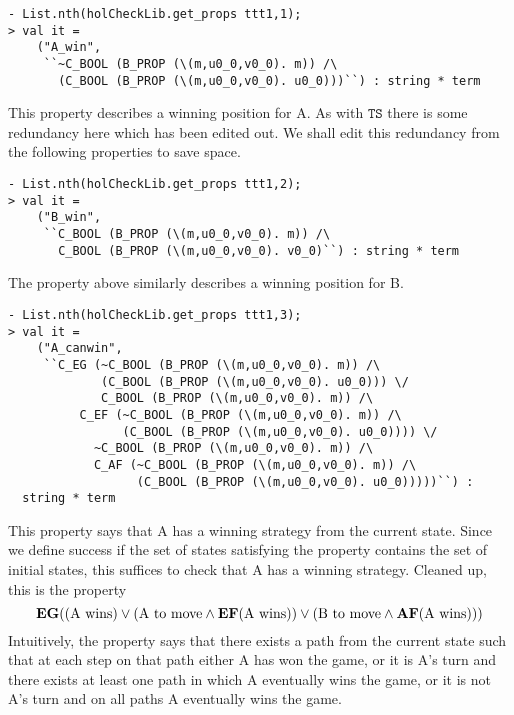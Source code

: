 \begin{session}
\begin{verbatim}
- List.nth(holCheckLib.get_props ttt1,1);
> val it =
    ("A_win",
     ``~C_BOOL (B_PROP (\(m,u0_0,v0_0). m)) /\
       (C_BOOL (B_PROP (\(m,u0_0,v0_0). u0_0)))``) : string * term
\end{verbatim}
\end{session}

This property describes a winning position for A. As with \(\mathtt{TS}\) there is some redundancy here which has been edited out. We shall edit this redundancy from the following properties to save space.

\begin{session}
\begin{verbatim}
- List.nth(holCheckLib.get_props ttt1,2);
> val it =
    ("B_win",
     ``C_BOOL (B_PROP (\(m,u0_0,v0_0). m)) /\
       C_BOOL (B_PROP (\(m,u0_0,v0_0). v0_0)``) : string * term
\end{verbatim}
\end{session}

The property above similarly describes a winning position for B.

\begin{session}\begin{verbatim}
- List.nth(holCheckLib.get_props ttt1,3);
> val it =
    ("A_canwin",
     ``C_EG (~C_BOOL (B_PROP (\(m,u0_0,v0_0). m)) /\
             (C_BOOL (B_PROP (\(m,u0_0,v0_0). u0_0))) \/
             C_BOOL (B_PROP (\(m,u0_0,v0_0). m)) /\
          C_EF (~C_BOOL (B_PROP (\(m,u0_0,v0_0). m)) /\
                (C_BOOL (B_PROP (\(m,u0_0,v0_0). u0_0)))) \/
            ~C_BOOL (B_PROP (\(m,u0_0,v0_0). m)) /\
            C_AF (~C_BOOL (B_PROP (\(m,u0_0,v0_0). m)) /\
                  (C_BOOL (B_PROP (\(m,u0_0,v0_0). u0_0)))))``) :
  string * term
\end{verbatim}\end{session}

This property says that A has a winning strategy from the current state. Since we define success if the set of states satisfying the property contains the set of initial states, this suffices to check that A has a winning strategy. Cleaned up, this is the \ctl property \[ \mathbf{EG} (\textup{(A wins)} \lor (\textup{A to move} \land \mathbf{EF} (\textup{A wins})) \lor (\textup{B to move} \land \mathbf{AF} (\textup{A wins})))\] Intuitively, the property says that there exists a path from the current state such that at each step on that path either A has won the game, or it is A's turn and there exists at least one path in which A eventually wins the game, or it is not A's turn and on all paths A eventually wins the game.

